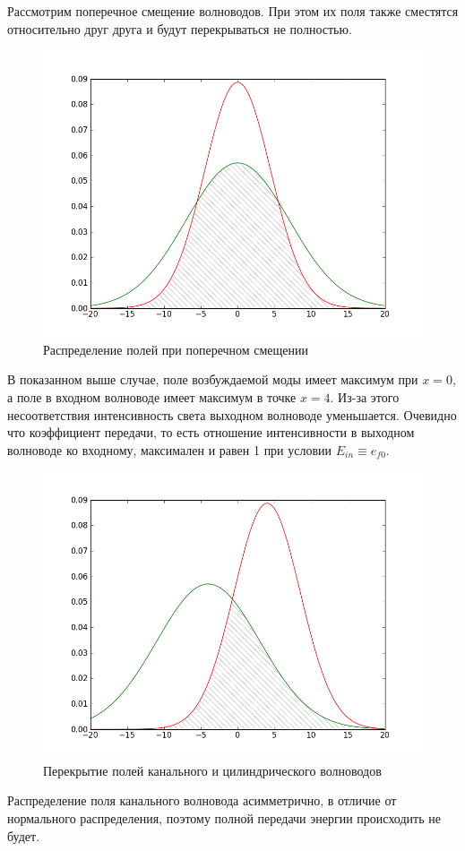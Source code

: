 Рассмотрим поперечное смещение волноводов. При этом их поля также сместятся относительно друг друга и будут перекрываться не полностью.

\begin{figure}[h!]
	\includegraphics[width=.5\textwidth]{img/intersection.png}
	\caption{Распределение полей при поперечном смещении}
\end{figure}

В показанном выше случае, поле возбуждаемой моды имеет максимум при $x=0$, а поле в входном волноводе имеет максимум в точке $x=4$. Из-за этого несоответствия интенсивность света выходном волноводе уменьшается. Очевидно что коэффициент передачи, то есть отношение интенсивности в выходном волноводе ко входному, максимален и равен 1 при условии $E_{in} \equiv e_{f0}$.

\begin{figure}[h!]
	\includegraphics[width=.5\textwidth]{img/intersection2.png}
	\caption{Перекрытие полей канального и цилиндрического волноводов}
\end{figure}

Распределение поля канального волновода асимметрично, в отличие от нормального распределения, поэтому полной передачи энергии происходить не будет.


